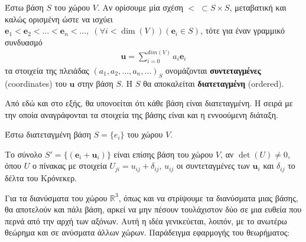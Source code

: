 \documentclass[main.tex]{subfiles}
\begin{document}
	\begin{definition}
		Έστω βάση $S$ του χώρου $V$. Αν ορίσουμε μία σχέση ${< \;\subset S \times S}$, μεταβατική και καλώς ορισμένη ώστε να ισχύει $\boldsymbol{e}_1 < \boldsymbol{e}_2 < \ldots < \boldsymbol{e}_n < \ldots, \; (\forall i < \dim(V))(\boldsymbol{e}_i \in S)$, τότε για έναν γραμμικό συνδυασμό
		\begin{align*}
			\boldsymbol{u} = \sum^{dim(V)}_{i=0}a_i\boldsymbol{e}_i
		\end{align*}
		τα στοιχεία της πλειάδας $(a_1, a_2, \ldots, a_n, \ldots)_S$ ονομάζονται \textbf{συντεταγμένες} (coordinates) του $\boldsymbol{u}$ στην βάση $S$. Η $S$ θα αποκαλείται \textbf{διατεταγμένη} (ordered).
	\end{definition}
	\begin{remark}
		Από εδώ και στο εξής, θα υπονοείται ότι κάθε βάση είναι διατεταγμένη. Η σειρά με την οποία αναγράφονται τα στοιχεία της βάσης είναι και η εννοούμενη διάταξη.
	\end{remark}
	\newpage
		Έστω διατεταγμένη βάση $S = \{e_i\}$ του χώρου $V$.
	\begin{theorem}
		Το σύνολο ${S' = \{(\boldsymbol{e}_i + \boldsymbol{u}_i)\}}$ είναι επίσης βάση του χώρου $V$, αν ${\det{(U)}\neq 0}$, όπου $U$ ο πίνακας με στοιχεία ${U_{ji} = u_{ij} + \delta_{ij}}$, ${u_{ij}}$ οι συντεταγμένες των $\boldsymbol{u}_i$ και $\delta_{ij}$ το δέλτα του Κρόνεκερ.
	\end{theorem}
	Για τα διανύσματα του χώρου $\mathbb{R}^3$, όπως και να στρίψουμε τα διανύσματα μιας βάσης, θα αποτελούν και πάλι βάση, αρκεί να μην πέσουν τουλάχιστον δύο σε μια ευθεία που περνά από την αρχή των αξόνων. Αυτή η ιδέα γενικεύεται, λοιπόν, με το ανωτέρω θεώρημα και σε ανύσματα άλλων χώρων. Παράδειγμα εφαρμογής του θεωρήματος:
\end{document}

